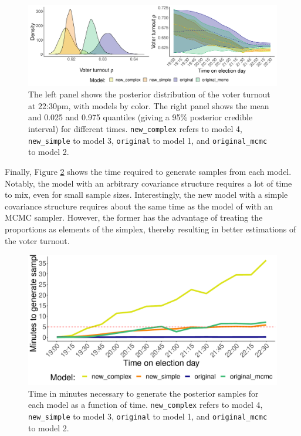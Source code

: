 \documentclass{article}
\begin{document}
\begin{figure}[h]
  \centering
  \includegraphics[width=\textwidth]{../fig/part.pdf}
  \caption{The left panel shows the posterior distribution of the voter turnout at 22:30pm, with models by color. The right panel shows the mean and 0.025 and 0.975 quantiles (giving a 95\% posterior credible interval) for different times. \texttt{new\_complex} refers to model 4, \texttt{new\_simple} to model 3, \texttt{original} to model 1, and \texttt{original\_mcmc} to model 2.}
  \label{fig:part}
\end{figure}


Finally, Figure \ref{fig:times} shows the time required to generate samples from each model. Notably, the model with an arbitrary covariance structure requires a lot of time to mix, even for small sample sizes. Interestingly, the new model with a simple covariance structure requires about the same time as the model of \citet{diluvi2018} with an MCMC sampler. However, the former has the advantage of treating the proportions as elements of the simplex, thereby resulting in better estimations of the voter turnout.


\begin{figure}[h]
  \centering
  \includegraphics[scale=0.5]{../fig/times.pdf}
  \caption{Time in minutes necessary to generate the posterior samples for each model as a function of time. \texttt{new\_complex} refers to model 4, \texttt{new\_simple} to model 3, \texttt{original} to model 1, and \texttt{original\_mcmc} to model 2.}
  \label{fig:times}
\end{figure}
\end{document}
